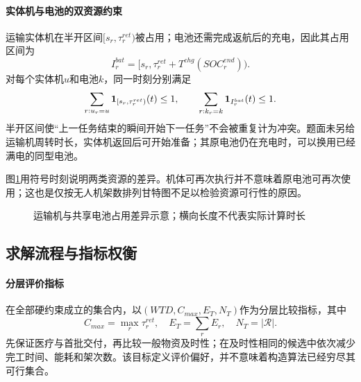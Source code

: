 \paragraph{实体机与电池的双资源约束}
运输实体机在半开区间$[s_r,\tau_r^{ret})$被占用；电池还需完成返航后的充电，因此其占用区间为
\begin{equation}I_r^{bat}=[s_r,\tau_r^{ret}+T^{chg}(SOC_r^{end})).\end{equation}
对每个实体机$u$和电池$k$，同一时刻分别满足
\begin{equation}
\sum_{r:u_r=u}\mathbf{1}_{[s_r,\tau_r^{ret})}(t)\le1,\qquad
\sum_{r:k_r=k}\mathbf{1}_{I_r^{bat}}(t)\le1.
\end{equation}
半开区间使“上一任务结束的瞬间开始下一任务”不会被重复计为冲突。题面未另给运输机周转时长，实体机返回后可开始准备；其原电池仍在充电时，可以换用已经满电的同型电池。

图\ref{fig:q2-resource}用符号时刻说明两类资源的差异。机体可再次执行并不意味着原电池可再次使用；这也是仅按无人机架数排列甘特图不足以检验资源可行性的原因。
\begin{figure}[htbp]\centering
{}
\caption{运输机与共享电池占用差异示意；横向长度不代表实际计算时长}\label{fig:q2-resource}
\end{figure}

\subsection{求解流程与指标权衡}
\paragraph{分层评价指标}
在全部硬约束成立的集合内，以$(WTD,C_{max},E_T,N_T)$作为分层比较指标，其中
\begin{equation}C_{max}=\max_r\tau_r^{ret},\quad E_T=\sum_rE_r,\quad N_T=|\mathcal R|.\end{equation}
先保证医疗与首批交付，再比较一般物资及时性；在及时性相同的候选中依次减少完工时间、能耗和架次数。该目标定义评价偏好，并不意味着构造算法已经穷尽其可行集合。

